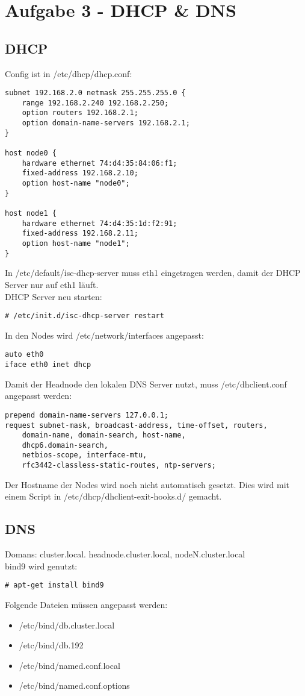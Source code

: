 \chapter{Aufgabe 3 - DHCP \& DNS}
\section{DHCP}
Config ist in /etc/dhcp/dhcp.conf:
\begin{lstlisting}[style=Bash]
subnet 192.168.2.0 netmask 255.255.255.0 {
	range 192.168.2.240 192.168.2.250;
	option routers 192.168.2.1;
	option domain-name-servers 192.168.2.1;
}

host node0 {
	hardware ethernet 74:d4:35:84:06:f1;
	fixed-address 192.168.2.10;
	option host-name "node0";
}

host node1 {
	hardware ethernet 74:d4:35:1d:f2:91;
	fixed-address 192.168.2.11;
	option host-name "node1";
}
\end{lstlisting}
In /etc/default/isc-dhcp-server muss eth1 eingetragen werden, damit der DHCP Server nur auf eth1 läuft.\\
DHCP Server neu starten:
\begin{lstlisting}[style=Bash]
# /etc/init.d/isc-dhcp-server restart
\end{lstlisting}
In den Nodes wird /etc/network/interfaces angepasst:
\begin{lstlisting}[style=Bash]
auto eth0
iface eth0 inet dhcp
\end{lstlisting}
Damit der Headnode den lokalen DNS Server nutzt, muss /etc/dhclient.conf angepasst werden:
\begin{lstlisting}[style=Bash]
prepend domain-name-servers 127.0.0.1;
request subnet-mask, broadcast-address, time-offset, routers,
	domain-name, domain-search, host-name,
	dhcp6.domain-search,
	netbios-scope, interface-mtu,
	rfc3442-classless-static-routes, ntp-servers;
\end{lstlisting}
Der Hostname der Nodes wird noch nicht automatisch gesetzt. Dies wird mit einem Script in /etc/dhcp/dhclient-exit-hooks.d/ gemacht.
\section{DNS}
Domans: cluster.local. headnode.cluster.local, nodeN.cluster.local\\
bind9 wird genutzt:
\begin{lstlisting}[style=Bash]
# apt-get install bind9
\end{lstlisting}
Folgende Dateien müssen angepasst werden:
\begin {itemize}
\item /etc/bind/db.cluster.local
\item /etc/bind/db.192
\item /etc/bind/named.conf.local
\item /etc/bind/named.conf.options
\end{itemize}
